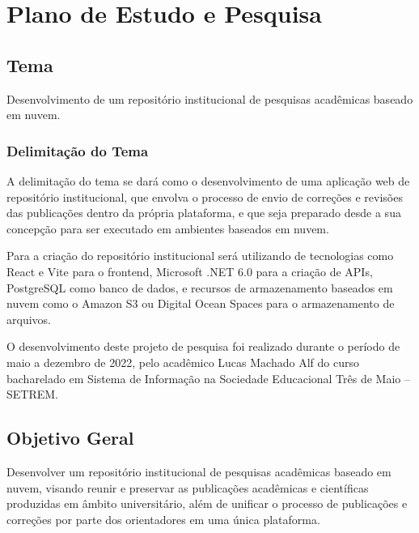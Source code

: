 \chapter{Plano de Estudo e Pesquisa} \label{chap:ResearchPlan}

\section{Tema} \label{sec::Theme}
Desenvolvimento de um repositório institucional de pesquisas acadêmicas
baseado em nuvem.

\subsection{Delimitação do Tema} \label{subsec::ThemeDelimitation}

A delimitação do tema se dará como o desenvolvimento de uma aplicação
web de repositório institucional, que envolva o processo de envio
de correções e revisões das publicações dentro da própria plataforma,
e que seja preparado desde a sua concepção para ser executado em ambientes
baseados em nuvem.

Para a criação do repositório institucional será utilizando de tecnologias
como React e Vite para o frontend, Microsoft .NET 6.0 para a criação
de APIs, PostgreSQL como banco de dados, e recursos de armazenamento baseados em
nuvem como o Amazon S3 ou Digital Ocean Spaces para o armazenamento de arquivos.

O desenvolvimento deste projeto de pesquisa foi realizado durante o período de
maio a dezembro de 2022, pelo acadêmico Lucas Machado Alf do curso bacharelado
em Sistema de Informação na Sociedade Educacional Três de Maio – SETREM.

\section{Objetivo Geral} \label{sec:objective}

Desenvolver um repositório institucional de pesquisas acadêmicas
baseado em nuvem, visando reunir e preservar as publicações acadêmicas
e científicas produzidas em âmbito universitário, além de unificar o processo
de publicações e correções por parte dos orientadores em uma única plataforma.

